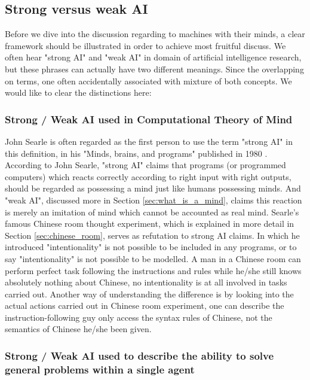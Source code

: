 \documentclass[11pt]{article}
\newenvironment{draft}{\color{dark-cornflower-blue-2}}{\ignorespacesafterend}
\begin{document}

\subsection{Strong versus weak AI}

\begin{draft}
Before we dive into the discussion regarding to machines with their minds, a clear framework should be illustrated in order to achieve most fruitful discuss. We often hear "strong AI" and "weak AI" in domain of artificial intelligence research, but these phrases can actually have two different meanings. Since the overlapping on terms, one often accidentally associated with mixture of both concepts. We would like to clear the distinctions here: 

\subsubsection*{Strong / Weak AI used in Computational Theory of Mind}

John Searle is often regarded as the first person to use the term "strong AI" in this definition, in his "Minds, brains, and programs" published in 1980 \cite{searle1980minds}. According to John Searle, "strong AI" claims that programs (or programmed computers) which reacts correctly according to right input with right outputs, should be regarded as possessing a mind just like humans possessing minds. And "weak AI", discussed more in Section \ref{sec:what_is_a_mind}, claims this reaction is merely an imitation of mind which cannot be accounted as real mind. Searle's famous Chinese room thought experiment, which is explained in more detail in Section \ref{sec:chinese_room}, serves as refutation to strong AI claims. In which he introduced "intentionality" is not possible to be included in any programs, or to say "intentionality" is not possible to be modelled. A man in a Chinese room can perform perfect task following the instructions and rules while he/she still knows absolutely nothing about Chinese, no intentionality is at all involved in tasks carried out. Another way of understanding the difference is by looking into the actual actions carried out in Chinese room experiment, one can describe the instruction-following guy only access the syntax rules of Chinese, not the semantics of Chinese he/she been given.

\subsubsection*{Strong / Weak AI used to describe the ability to solve general problems within a single agent}


\end{draft}
\end{document}
